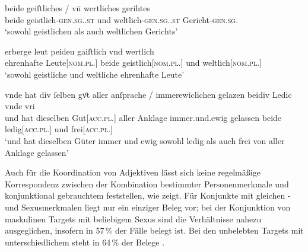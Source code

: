 \begin{exe}
\ex \label{ex:caobeidkoordtarg}
	\begin{xlist}
	\ex \label{ex:caobeidkoordtarg_1}
		\gll beide geiſtliches / vn̄ wertliches gerihtes \\
			beide geistlich-\textsc{gen.sg.\NeutI.st} {} und
			weltlich-\textsc{gen.sg.\NeutI.st} Gericht-\textsc{gen.sg.\NeutI} \\
		\trans `sowohl geistlichen als auch weltlichen Gerichts'
			\parencites(Nr.~1764, Bamberg, 1293)[71,26]{cao3}

	\ex \label{ex:caobeidkoordtarg_2}
		\gll erberge leut peideu gaiſtlich vnd wertlich \\
			ehrenhafte Leute[\textsc{nom.pl.\MascA}] beide geistlich[\textsc{nom.pl.\MascA}]
			und weltlich[\textsc{nom.pl.\MascA}] \\
		\trans `sowohl geistliche und weltliche ehrenhafte Leute'
			\parencites(Nr.~1153, Engelthal, Kr.~Nürnberger Land, 1289)[431,44]{cao2}

	\ex \label{ex:caobeidkoordtarg_3}
		\gll vnde hat {div ſelben} gvͦt \textelp{} aller anſprache /
			immerewiclichen gelazen beidiv Ledic vnde vri \\
			und hat dieselben Gut[\textsc{acc.pl.\NeutI}] {} aller Anklage {}
			immer.und.ewig gelassen beide ledig[\textsc{acc.pl.\NeutI}] und
			frei[\textsc{acc.pl.\NeutI}] \\
		\trans `und hat dieselben Güter \textelp{} immer und ewig sowohl
			ledig als auch frei von aller Anklage gelassen'
			\parencites(Nr.~2293, Bamberg, 1295)[420,21--23]{cao3}
	\end{xlist}
\end{exe}

Auch für die Koordination von Adjektiven lässt sich keine regelmäßige
Korrespondenz zwischen der Kombination bestimmter Personenmerkmale und
konjunktional gebrauchtem  feststellen, wie
 zeigt. Für Konjunkte mit gleichen - und
Sexusmerkmalen liegt nur ein einziger Beleg vor; bei der Konjunktion von
maskulinen Targets mit beliebigem Sexus sind die Verhältnisse nahezu
ausgeglichen, insofern in 57\,\% der Fälle  belegt ist. Bei den
unbelebten Targets mit unterschiedlichem  steht in
64\,\% der Belege .

